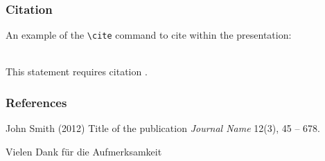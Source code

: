 \documentclass{beamer}
\begin{document}
\begin{frame}[fragile] %
\frametitle{Citation}
An example of the \verb|\cite| command to cite within the presentation:\\~

This statement requires citation \cite{p1}.
\end{frame}


\begin{frame}
\frametitle{References}
\footnotesize{
\begin{thebibliography}{99} %
 John Smith (2012)
\newblock Title of the publication
\newblock \emph{Journal Name} 12(3), 45 -- 678.
\end{thebibliography}
}
\end{frame}


\begin{frame}
\Huge{\centerline{Vielen Dank f\"{u}r die Aufmerksamkeit}}
\end{frame}

\end{document}
